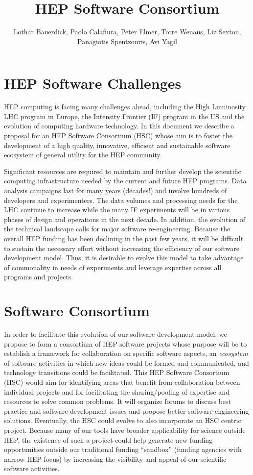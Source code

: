 \documentclass[12pt,letterpaper,fleqn]{article}
\author{Lothar Bauerdick, Paolo Calafiura, Peter Elmer, Torre Wenaus, Liz Sexton, \\
Panagiotis Spentzouris, Avi Yagil}
\title{ HEP Software Consortium}
\begin{document}
\maketitle
\linenumbers

\section{HEP Software Challenges}
\label{sec:challenges}


HEP computing is facing many challenges ahead, including the High
Luminosity LHC program in Europe, the Intensity Frontier (IF) program
in the US and the evolution of computing hardware technology. In
this document we describe a proposal for an HEP Software Consortium
(HSC) whose aim is to foster the development of a high quality,
innovative, efficient and sustainable software ecosystem of general
utility for the HEP community.

Significant resources are required to maintain and further develop
the scientific computing infrastructure needed by the current and
future HEP programs.  Data analysis campaigns last for many years
(decades!) and involve hundreds of developers and experimenters.
The data volumes and processing needs for the LHC continue to
increase  while the many IF
experiments will be in various phases of design and operations in
the next decade.  In addition, the evolution of the technical
landscape calls for major software re-engineering.  Because the
overall HEP funding has been declining in the past few years, it
will be difficult to sustain the necessary effort without increasing
the efficiency of our software development model.   Thus, it is
desirable to evolve this model to take advantage of commonality in
needs of experiments and leverage expertise across all programs and
projects.

\section{Software Consortium}
\label{sec:consortium}

In order to facilitate this evolution of our software development
model, we propose to form a consortium of HEP software projects
whose purpose will be to establish a framework for collaboration
on specific software aspects, an {\it ecosystem} of software activities
in which new ideas could be formed and communicated, and technology
transitions could be facilitated.  This HEP Software Consortium
(HSC) would aim for identifying areas that benefit from collaboration
between individual projects and for facilitating the sharing/pooling
of expertise and resources to solve common problems.  It will
organize forums to discuss best practice and software development
issues and propose better software engineering solutions.  Eventually,
the HSC could evolve to also incorporate an HSC centric project.
Because many of our tools have broader applicability for science
outside HEP, the existence of such a project could help generate
new funding opportunities outside our traditional funding “sandbox”
(funding agencies with narrow HEP focus) by increasing the visibility
and appeal of our scientific software activities.
\end{document}
